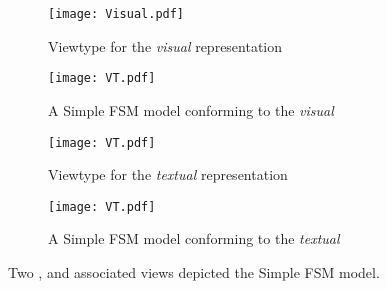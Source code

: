 \begin{figure*}
    \centering
    \begin{subfigure}[b]{0.45\textwidth}
			\centering
      \texttt{[image: Visual.pdf]}
      \caption{Viewtype for the \emph{visual} representation}
      \label{fig:VT:VMM}
    \end{subfigure}
    \hfill
    \begin{subfigure}[b]{0.45\textwidth}
			\centering
      \texttt{[image: VT.pdf]}
      \caption{A \textsf{Simple FSM} model conforming to the \emph{visual} \viewtype}
      \label{fig:VT:VM}
    \end{subfigure}
    \hfill
    \begin{subfigure}[b]{0.45\textwidth}
			\centering
      \texttt{[image: VT.pdf]}
      \caption{Viewtype for the \emph{textual} representation }
      \label{fig:VT:TMM}
    \end{subfigure}
    \hfill
    \begin{subfigure}[b]{0.45\textwidth}
			\centering
      \texttt{[image: VT.pdf]}
      \caption{A \textsf{Simple FSM} model conforming to the \emph{textual} \viewtype}
      \label{fig:VT:TM}
    \end{subfigure}
    \caption{Two \viewtypes, and associated views depicted the \textsf{Simple FSM} model.}
    \label{fig:VT}
\end{figure*}
